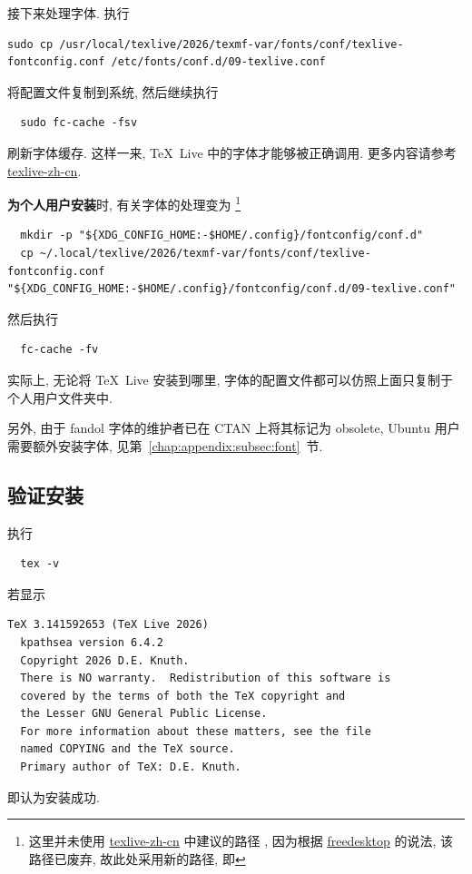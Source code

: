 接下来处理字体.
执行
\begin{lstlisting}[deletekeywords = local]
  sudo cp /usr/local/texlive/2026/texmf-var/fonts/conf/texlive-fontconfig.conf /etc/fonts/conf.d/09-texlive.conf
\end{lstlisting}
将配置文件复制到系统,
然后继续执行
\begin{lstlisting}
  sudo fc-cache -fsv
\end{lstlisting}
刷新字体缓存.
这样一来, \TeX~Live 中的字体才能够被正确调用.
更多内容请参考 \href{https://tug.org/texlive/doc/texlive-zh-cn/texlive-zh-cn.pdf}{\textsf{texlive-zh-cn}}.

\textbf{为个人用户安装}时,
有关字体的处理变为%
\footnote{这里并未使用
\href{https://tug.org/texlive/doc/texlive-zh-cn/texlive-zh-cn.pdf}{\textsf{texlive-zh-cn}}
中建议的路径 ,
因为根据 \href{https://www.freedesktop.org/software/fontconfig/fontconfig-user.html}{freedesktop} 的说法,
该路径已废弃,
故此处采用新的路径,
即 }
\begin{lstlisting}
  mkdir -p "${XDG_CONFIG_HOME:-$HOME/.config}/fontconfig/conf.d"
  cp ~/.local/texlive/2026/texmf-var/fonts/conf/texlive-fontconfig.conf "${XDG_CONFIG_HOME:-$HOME/.config}/fontconfig/conf.d/09-texlive.conf"
\end{lstlisting}
然后执行
\begin{lstlisting}
  fc-cache -fv
\end{lstlisting}
实际上,
无论将 \TeX~Live 安装到哪里,
字体的配置文件都可以仿照上面只复制于个人用户文件夹中.

另外,
由于 fandol 字体的维护者已在 CTAN 上将其标记为 obsolete,
Ubuntu 用户需要额外安装字体,
见第~\ref{chap:appendix:subsec:font}~节.

\subsection{验证安装}

执行
\begin{lstlisting}
  tex -v
\end{lstlisting}
若显示
\begin{lstlisting}[language = {}]
  TeX 3.141592653 (TeX Live 2026)
  kpathsea version 6.4.2
  Copyright 2026 D.E. Knuth.
  There is NO warranty.  Redistribution of this software is
  covered by the terms of both the TeX copyright and
  the Lesser GNU General Public License.
  For more information about these matters, see the file
  named COPYING and the TeX source.
  Primary author of TeX: D.E. Knuth.
\end{lstlisting}
即认为安装成功.

